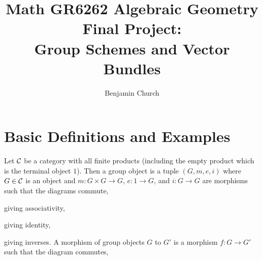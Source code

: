 \documentclass[12pt]{article}
\begin{document}
\title{%
	\large \textbf{Math GR6262 Algebraic Geometry
	\\ Final Project: 
	\\ Group Schemes and Vector Bundles} \vspace{-2ex}}
\author{Benjamin Church }
\maketitle

\section{Basic Definitions and Examples}

\begin{definition}
Let $\mathcal{C}$ be a category with all finite products (including the empty product which is the terminal object $1$). Then a group object is a tuple $(G, m, e, i)$ where $G \in \mathcal{C}$ is an object and $m : G \times G \to G$, $e : 1 \to G$, and $i : G \to G$ are morphisms such that the diagrams commute,
\begin{center}
\end{center}
giving associativity,
\begin{center}
\end{center}
giving identity,
\begin{center}
\end{center}
giving inverses. A morphism of group objects $G$ to $G'$ is a morphism $f : G \to G'$ such that the diagram commutes,
\begin{center}
\end{center}
\end{definition}
\end{document}
